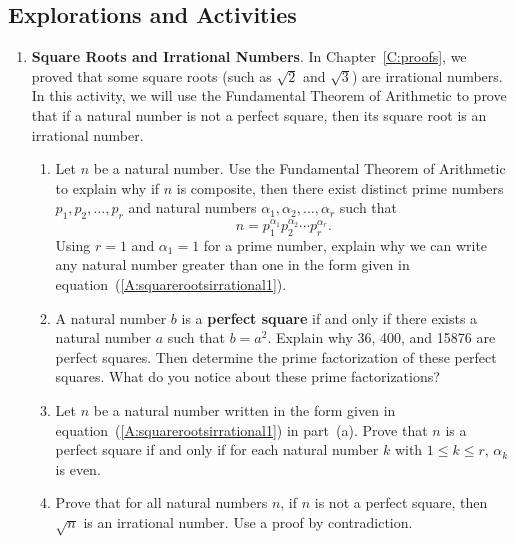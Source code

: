 \subsection*{Explorations and Activities}
\setcounter{oldenumi}{\theenumi}
\begin{enumerate} \setcounter{enumi}{\theoldenumi}
\item \textbf{Square Roots and Irrational Numbers}.  \label{exer82:squareroot}  In Chapter~\ref{C:proofs}, we proved that some square roots (such as $\sqrt{2}$ and 
$\sqrt{3}$) are irrational numbers.  In this activity, we will use the Fundamental Theorem of Arithmetic to prove that if a natural number is not a perfect square, then its square root is an irrational number.

\setcounter{equation}{0}
\begin{enumerate}
\item \label{exer82:squareroot-a}Let $n$ be a natural number.  Use the Fundamental Theorem of Arithmetic to explain why if $n$ is composite, then there exist distinct prime numbers $p_1, p_2, \ldots, p_r$ and natural numbers 
$\alpha_1, \alpha_2, \ldots, \alpha_r$ such that
\begin{equation}\label{A:squarerootsirrational1}
n = p_1^{\alpha_1} p_2^{\alpha_2} \cdots p_r^{\alpha_r}.
\end{equation}
Using $r = 1$ and $\alpha_1 = 1$ for a prime number, explain why we can write any natural number greater than one in the form given in equation~(\ref{A:squarerootsirrational1}).

\item A natural number $b$ is a \textbf{perfect square}
%
 if and only if there exists a natural number $a$ such that $b = a^2$.  Explain why 36, 400, and 15876 are perfect squares.  Then determine the prime factorization of these perfect squares.  What do you notice about these prime factorizations?

\item Let $n$ be a natural number written in the form given in 
equation~(\ref{A:squarerootsirrational1}) in part~(a).  Prove that $n$ is a perfect square if and only if for each natural number $k$ with $1 \leq k \leq r$, $\alpha_k$ is even.

\item Prove that for all natural numbers $n$, if $n$ is not a perfect square, then 
$\sqrt{n}$ is an irrational number. \hint  Use a proof by contradiction.
\end{enumerate}
\hbreak

\end{enumerate}

\endinput
